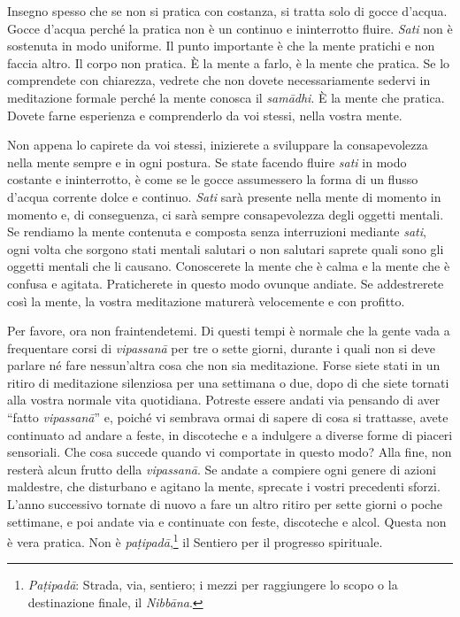 Insegno spesso che se non si pratica con costanza, si tratta solo di
gocce d'acqua. Gocce d'acqua perché la pratica non è un continuo e
ininterrotto fluire. \emph{Sati} non è sostenuta in modo uniforme. Il
punto importante è che la mente pratichi e non faccia altro. Il corpo
non pratica. È la mente a farlo, è la mente che pratica. Se lo
comprendete con chiarezza, vedrete che non dovete necessariamente
sedervi in meditazione formale perché la mente conosca il
\emph{samādhi}. È la mente che pratica. Dovete farne esperienza e
comprenderlo da voi stessi, nella vostra mente.

Non appena lo capirete da voi stessi, inizierete a sviluppare la
consapevolezza nella mente sempre e in ogni postura. Se state facendo
fluire \emph{sati} in modo costante e ininterrotto, è come se le gocce
assumessero la forma di un flusso d'acqua corrente dolce e continuo.
\emph{Sati} sarà presente nella mente di momento in momento e, di
conseguenza, ci sarà sempre consapevolezza degli oggetti mentali. Se
rendiamo la mente contenuta e composta senza interruzioni mediante
\emph{sati}, ogni volta che sorgono stati mentali salutari o non
salutari saprete quali sono gli oggetti mentali che li causano.
Conoscerete la mente che è calma e la mente che è confusa e agitata.
Praticherete in questo modo ovunque andiate. Se addestrerete così la
mente, la vostra meditazione maturerà velocemente e con profitto.

Per favore, ora non fraintendetemi. Di questi tempi è normale che la
gente vada a frequentare corsi di \emph{vipassanā} per tre o sette
giorni, durante i quali non si deve parlare né fare nessun'altra cosa
che non sia meditazione. Forse siete stati in un ritiro di meditazione
silenziosa per una settimana o due, dopo di che siete tornati alla
vostra normale vita quotidiana. Potreste essere andati via pensando di
aver ``fatto \emph{vipassanā}'' e, poiché vi sembrava ormai di sapere di
cosa si trattasse, avete continuato ad andare a feste, in discoteche e a
indulgere a diverse forme di piaceri sensoriali. Che cosa succede quando
vi comportate in questo modo? Alla fine, non resterà alcun frutto della
\emph{vipassanā}. Se andate a compiere ogni genere di azioni maldestre,
che disturbano e agitano la mente, sprecate i vostri precedenti sforzi.
L'anno successivo tornate di nuovo a fare un altro ritiro per sette
giorni o poche settimane, e poi andate via e continuate con feste,
discoteche e alcol. Questa non è vera pratica. Non è
\emph{paṭipadā},\footnote{\emph{Paṭipadā}: Strada, via, sentiero; i
  mezzi per raggiungere lo scopo o la destinazione finale, il
  \emph{Nibbāna}.} il Sentiero per il progresso spirituale.

